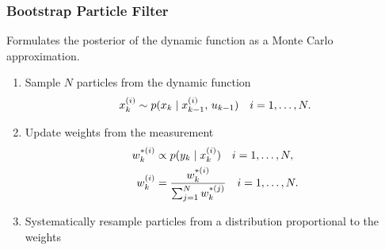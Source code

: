 \documentclass[aspectratio=43]{beamer}
\begin{document}
\begin{frame}
  \frametitle{Bootstrap Particle Filter}
  Formulates the posterior of the dynamic function as a Monte Carlo approximation.
  \vspace{0.4em}
  \begin{block}{}
    \begin{enumerate}
    \item Sample $N$ particles from the dynamic function
    \begin{align}
        x_k^{(i)} \sim p(x_k \mid x_{k-1}^{(i)},\,u_{k-1}) \quad i = 1,\dots, N. \notag
    \end{align}
    \item Update weights from the measurement
    \begin{equation}
        \begin{aligned}
            w_k^{*(i)} &\propto p(y_k \mid x_k^{(i)})  \quad i = 1,\dots, N  ,\\
            w_k^{(i)} &= \frac{w_k^{*(i)}}{\sum_{j=1}^{N} w_k^{*(j)}} \quad i = 1,\dots, N .
        \end{aligned} \notag
    \end{equation}
    \item Systematically resample particles from a distribution proportional to the weights
    \end{enumerate}
  \end{block}
\end{frame}
\end{document}
